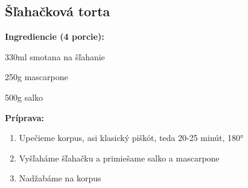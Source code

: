 \setcounter{step}{0}

\subsection{ Šľahačková torta }

\begin{ingredient}
  
  \def\portions{  }
  \textbf{ {\normalsize Ingrediencie (4 porcie):} }

  \begin{main}
      \item 330ml smotana na šľahanie
      \item 250g mascarpone
      \item 500g salko
  \end{main}
  
\end{ingredient}
\begin{recipe}
\textbf{ {\normalsize Príprava:} }
\begin{enumerate}

  \item{Upečieme korpus, asi klasický piškót, teda 20-25 minút, 180°}
  \item{Vyšľaháme šľahačku a primiešame salko a mascarpone}
  \item{Nadžabáme na korpus}

\end{enumerate}
\end{recipe}

\begin{notes}
  
\end{notes}	
\clearpage
